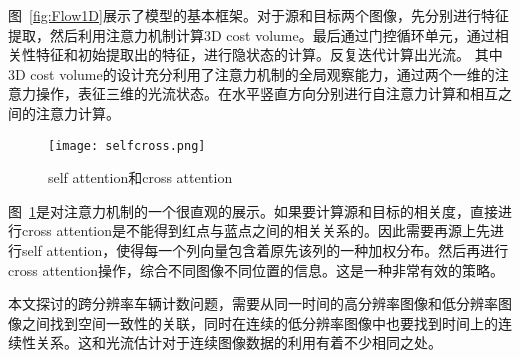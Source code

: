 图~\ref{fig:Flow1D}展示了模型的基本框架。对于源和目标两个图像，先分别进行特征提取，然后利用注意力机制计算3D cost volume。最后通过门控循环单元，通过相关性特征和初始提取出的特征，进行隐状态的计算。反复迭代计算出光流。
其中3D cost volume的设计充分利用了注意力机制的全局观察能力，通过两个一维的注意力操作，表征三维的光流状态。在水平竖直方向分别进行自注意力计算和相互之间的注意力计算。

\begin{figure}[H]
  \centering
  \texttt{[image: selfcross.png]}
  \caption{self attention和cross attention}
  \label{fig:selfcross}
\end{figure}
图~\ref{fig:selfcross}是对注意力机制的一个很直观的展示。如果要计算源和目标的相关度，直接进行cross attention是不能得到红点与蓝点之间的相关关系的。因此需要再源上先进行self attention，使得每一个列向量包含着原先该列的一种加权分布。然后再进行cross attention操作，综合不同图像不同位置的信息。这是一种非常有效的策略。

本文探讨的跨分辨率车辆计数问题，需要从同一时间的高分辨率图像和低分辨率图像之间找到空间一致性的关联，同时在连续的低分辨率图像中也要找到时间上的连续性关系。这和光流估计对于连续图像数据的利用有着不少相同之处。


